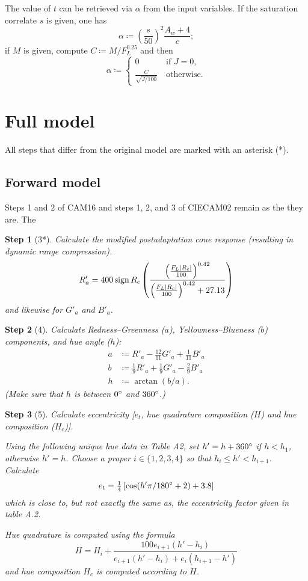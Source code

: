 \documentclass[twocolumn]{scrartcl}
\theoremstyle{named}
\newtheorem*{step}{Step}
\DeclarePairedDelimiter\abs{\lvert}{\rvert}%
\DeclareMathOperator{\sign}{sign}
\begin{document}
The value of $t$ can be retrieved via $\alpha$ from the input variables.
If the saturation correlate $s$ is given, one has
\[
  \alpha \coloneqq {\left(\frac{s}{50}\right)}^2 \frac{A_w+4}{c};
\]
if $M$ is given, compute $C\coloneqq M / F_L^{0.25}$ and then
\[
\alpha\coloneqq\begin{cases}
  0 &\:\text{if $J=0$,}\\
  \frac{C}{\sqrt{J/100}}&\:\text{otherwise}.
\end{cases}\]


\section{Full model}

All steps that differ from the original model are marked with an asterisk (*).

\subsection{Forward model}

Steps 1 and 2 of CAM16 and steps 1, 2, and 3 of CIECAM02 remain as the they are.
The

\begin{step}[3*]
Calculate the modified postadaptation cone response
(resulting in dynamic range compression).
\[
  R'_a = 400 \sign{R_c} \left(
    \frac
    {{\left(\frac{F_L \abs{R_c}}{100}\right)}^{0.42}}
    {{\left(\frac{F_L \abs{R_c}}{100}\right)}^{0.42} + 27.13}
    \right)
\]
and likewise for $G'_a$ and $B'_a$.
\end{step}

\begin{step}[4]
Calculate Redness--Greenness ($a$), Yellowness--Blueness ($b$) components,
and hue angle ($h$):
\begin{align*}
  a&\coloneqq R'_a - \tfrac{12}{11} G'_a + \tfrac{1}{11} B'_a\\
  b&\coloneqq \tfrac{1}{9} R'_a + \tfrac{1}{9} G'_a - \tfrac{2}{9} B'_a\\
  h&\coloneqq \arctan(b/a).
\end{align*}
(Make sure that $h$ is between $0\degree$ and $360\degree$.)
\end{step}

\begin{step}[5]
Calculate eccentricity [$e_t$, hue quadrature composition
($H$) and hue composition ($H_c$)].

Using the following unique hue data in Table A2, set
$h'= h + 360\degree$ if $h < h_1$, otherwise $h'=h$.
Choose a proper $i\in\{1,2,3,4\}$ so that $h_i\le h' < h_{i+1}$.
Calculate
\[
  e_t = \tfrac{1}{4}
  \left[
    \cos(h'\pi/180\degree + 2) + 3.8
  \right]
\]
which is close to, but not exactly the same as, the eccentricity factor given
in table A.2.

Hue quadrature is computed using the formula
\[
  H = H_i + \frac{100 e_{i+1} (h'-h_i)}{e_{i+1}(h'-h_i) + e_i (h_{i+1}-h')}
\]
and hue composition $H_c$ is computed according to $H$. %
\end{step}
\end{document}
